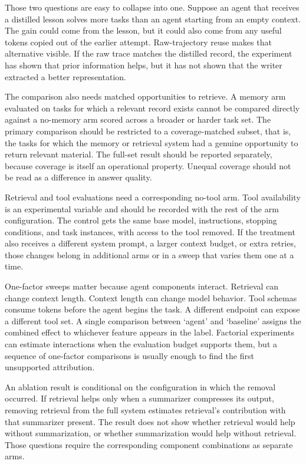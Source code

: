 Those two questions are easy to collapse into one. Suppose an agent that receives a distilled lesson solves more tasks than an agent starting from an empty context. The gain could come from the lesson, but it could also come from any useful tokens copied out of the earlier attempt. Raw-trajectory reuse makes that alternative visible. If the raw trace matches the distilled record, the experiment has shown that prior information helps, but it has not shown that the writer extracted a better representation.

The comparison also needs matched opportunities to retrieve. A memory arm evaluated on tasks for which a relevant record exists cannot be compared directly against a no-memory arm scored across a broader or harder task set. The primary comparison should be restricted to a coverage-matched subset, that is, the tasks for which the memory or retrieval system had a genuine opportunity to return relevant material. The full-set result should be reported separately, because coverage is itself an operational property. Unequal coverage should not be read as a difference in answer quality.

Retrieval and tool evaluations need a corresponding no-tool arm. Tool availability is an experimental variable and should be recorded with the rest of the arm configuration. The control gets the same base model, instructions, stopping conditions, and task instances, with access to the tool removed. If the treatment also receives a different system prompt, a larger context budget, or extra retries, those changes belong in additional arms or in a sweep that varies them one at a time.

One-factor sweeps matter because agent components interact. Retrieval can change context length. Context length can change model behavior. Tool schemas consume tokens before the agent begins the task. A different endpoint can expose a different tool set. A single comparison between `agent' and `baseline' assigns the combined effect to whichever feature appears in the label. Factorial experiments can estimate interactions when the evaluation budget supports them, but a sequence of one-factor comparisons is usually enough to find the first unsupported attribution.

An ablation result is conditional on the configuration in which the removal occurred. If retrieval helps only when a summarizer compresses its output, removing retrieval from the full system estimates retrieval's contribution with that summarizer present. The result does not show whether retrieval would help without summarization, or whether summarization would help without retrieval. Those questions require the corresponding component combinations as separate arms.

